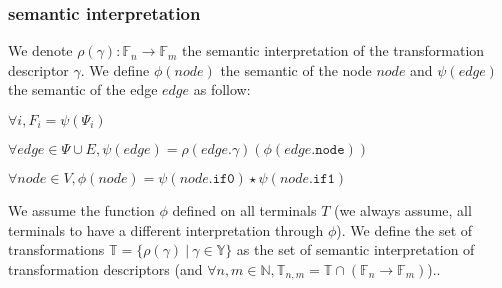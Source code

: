 \documentclass[a4paper,10pt]{article}
\newcommand{\N}{\mathbb{N}}%
\newcommand{\F}{\mathbb{F}}
\newcommand{\Y}{\mathbb{Y}}
\newcommand{\T}{\mathbb{T}}
\newcommand{\fieldNode}{\texttt{node}}
\newcommand{\fieldGamma}{\mathtt{\gamma}}
\newcommand{\fieldThen}{\mathtt{if1}}
\newcommand{\fieldElse}{\mathtt{if0}}
\begin{document}
\subsubsection{semantic interpretation}
We denote $\rho(\gamma): \F_n \longrightarrow \F_m$ the semantic interpretation of the transformation descriptor $\gamma$.
We define $\phi(node)$ the semantic of the node $node$ and $\psi(edge)$ the semantic of the edge $edge$ as follow: \begin{compactitem}
\item $\forall i, F_i = \psi(\Psi_i)$
\item $\forall edge \in \Psi \cup E, \psi(edge) = \rho(edge.\fieldGamma{})(\phi(edge.\fieldNode{}))$
\item $\forall node \in V, \phi(node) = \psi(node.\fieldElse{}) \star \psi(node.\fieldThen{})$
\end{compactitem}
We assume the function $\phi$ defined on all terminals $T$ (we always assume, all terminals to have a different interpretation through $\phi$).
We define the set of transformations $\T = \{\rho(\gamma)~|~\gamma\in\Y\}$ as the set of semantic interpretation of transformation descriptors (and $\forall n, m\in\N, \T_{n, m} = \T \cap (\F_n \longrightarrow \F_m)$)..
\end{document}
